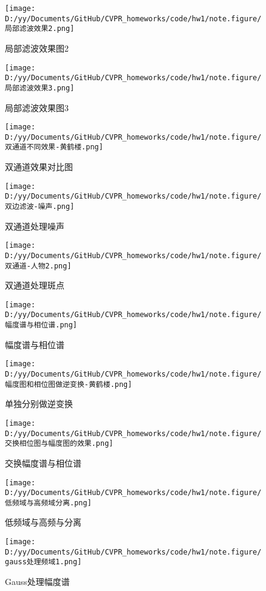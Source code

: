 \documentclass[12pt, a4paper, oneside]{ctexart}
\begin{document}
\begin{figure}[htbp]
    \centering
    \texttt{[image: D:/yy/Documents/GitHub/CVPR\_homeworks/code/hw1/note.figure/局部滤波效果2.png]}
    \caption{局部滤波效果图2\label{局部滤波2}}
\end{figure}
\begin{figure}[htbp]
    \centering
    \texttt{[image: D:/yy/Documents/GitHub/CVPR\_homeworks/code/hw1/note.figure/局部滤波效果3.png]}
    \caption{局部滤波效果图3\label{局部滤波3}}
\end{figure}
\begin{figure}[htbp]
    \centering
    \texttt{[image: D:/yy/Documents/GitHub/CVPR\_homeworks/code/hw1/note.figure/双通道不同效果-黄鹤楼.png]}
    \caption{双通道效果对比图\label{双通道效果对比图}}
\end{figure}
\begin{figure}[htbp]
    \centering
    \texttt{[image: D:/yy/Documents/GitHub/CVPR\_homeworks/code/hw1/note.figure/双边滤波-噪声.png]}
    \caption{双通道处理噪声\label{双通道处理噪声}}
\end{figure}
\begin{figure}[htbp]
    \centering
    \texttt{[image: D:/yy/Documents/GitHub/CVPR\_homeworks/code/hw1/note.figure/双通道-人物2.png]}
    \caption{双通道处理斑点\label{双通道处理斑点}}
\end{figure}
\begin{figure}[htbp]
    \centering
    \texttt{[image: D:/yy/Documents/GitHub/CVPR\_homeworks/code/hw1/note.figure/幅度谱与相位谱.png]}
    \caption{幅度谱与相位谱\label{幅度谱与相位谱}}
\end{figure}
\begin{figure}[htbp]
    \centering
    \texttt{[image: D:/yy/Documents/GitHub/CVPR\_homeworks/code/hw1/note.figure/幅度图和相位图做逆变换-黄鹤楼.png]}
    \caption{单独分别做逆变换\label{单独分别做逆变换}}
\end{figure}
\begin{figure}[htbp]
    \centering
    \texttt{[image: D:/yy/Documents/GitHub/CVPR\_homeworks/code/hw1/note.figure/交换相位图与幅度图的效果.png]}
    \caption{交换幅度谱与相位谱\label{交换幅度谱与相位谱}}
\end{figure}
\begin{figure}[htbp]
    \centering
    \texttt{[image: D:/yy/Documents/GitHub/CVPR\_homeworks/code/hw1/note.figure/低频域与高频域分离.png]}
    \caption{低频域与高频与分离\label{低频域与高频与分离}}
\end{figure}
\begin{figure}[htbp]
    \centering
    \texttt{[image: D:/yy/Documents/GitHub/CVPR\_homeworks/code/hw1/note.figure/gauss处理频域1.png]}
    \caption{Gauss处理幅度谱\label{Gauss处理幅度谱}}
\end{figure}
\clearpage
\end{document}
